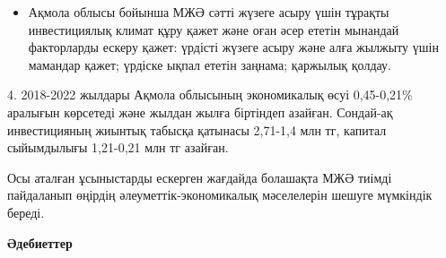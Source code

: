 \begin{itemize}
\item
  Ақмола облысы бойынша МЖӘ сәтті жүзеге асыру үшін тұрақты
  инвестициялық климат құру қажет және оған әсер ететін мынандай
  факторларды ескеру қажет: үрдісті жүзеге асыру және алға жылжыту үшін
  мамандар қажет; үрдіске ықпал ететін заңнама; қаржылық қолдау.
\end{itemize}

4. 2018-2022 жылдары Ақмола облысының экономикалық өсуі 0,45-0,21\%
аралығын көрсетеді және жылдан жылға біртіндеп азайған. Сондай-ақ
инвестицияның жиынтық табысқа қатынасы 2,71-1,4 млн тг, капитал
сыйымдылығы 1,21-0,21 млн тг азайған.

Осы аталған ұсыныстарды ескерген жағдайда болашақта МЖӘ тиімді
пайдаланып өңірдің әлеуметтік-экономикалық мәселелерін шешуге мүмкіндік
береді.

{\bfseries Әдебиеттер}

